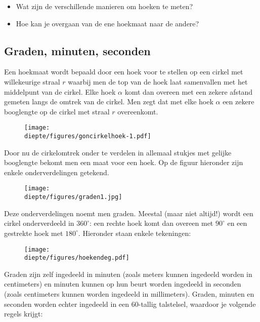 \documentclass[a4paper,12pt]{article}
\newcommand{\diepte}{./}
\begin{document}
\begin{itemize}
	\item Wat zijn de verschillende manieren om hoeken te meten?
	\item Hoe kan je overgaan van de ene hoekmaat naar de andere?
\end{itemize}

\subsection{Graden, minuten, seconden}

Een hoekmaat wordt bepaald door een hoek voor te stellen op een cirkel met willekeurige straal $r$ waarbij men de top van de hoek laat samenvallen met het middelpunt van de cirkel. Elke hoek $\alpha$ komt dan overeen met een zekere afstand gemeten langs de omtrek van de cirkel. Men zegt dat met elke hoek $\alpha$ een zekere booglengte op de cirkel met straal $r$ overeenkomt.

\begin{figure}[h]
\begin{center}
\texttt{[image: \\diepte/figures/goncirkelhoek-1.pdf]}
\end{center}
\end{figure}

Door nu de cirkelomtrek onder te verdelen in allemaal stukjes met gelijke booglengte bekomt men een maat voor een hoek. Op de figuur hieronder zijn enkele onderverdelingen getekend.

\begin{figure}[h]
\begin{center}
\texttt{[image: \\diepte/figures/graden1.jpg]}
\end{center}
\end{figure}

Deze onderverdelingen noemt men graden. Meestal (maar niet altijd!) wordt een cirkel onderverdeeld in $360^\circ$: een rechte hoek komt dan overeen met $90^\circ$ en een gestrekte hoek met $180^\circ$. Hieronder staan enkele tekeningen:

\begin{figure}[h]
\begin{center}
\texttt{[image: \\diepte/figures/hoekendeg.pdf]}
\end{center}
\end{figure}

Graden zijn zelf ingedeeld in minuten (zoals meters kunnen ingedeeld worden in centimeters) en minuten kunnen op hun beurt worden ingedeeld in seconden (zoals centimeters kunnen worden ingedeeld in millimeters).  Graden, minuten en seconden worden echter ingedeeld in een $60$-tallig talstelsel, waardoor je volgende regels krijgt:
\end{document}
